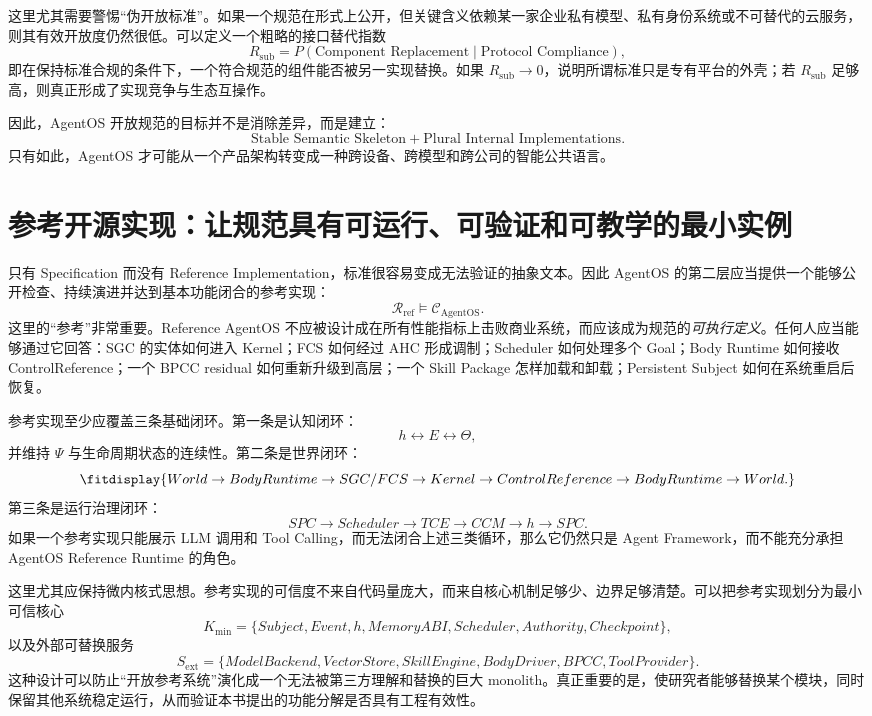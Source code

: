 这里尤其需要警惕``伪开放标准''。如果一个规范在形式上公开，但关键含义依赖某一家企业私有模型、私有身份系统或不可替代的云服务，则其有效开放度仍然很低。可以定义一个粗略的接口替代指数
\[
R_{\mathrm{sub}}
=
P(
\text{Component Replacement}
\mid
\text{Protocol Compliance}
),
\]
即在保持标准合规的条件下，一个符合规范的组件能否被另一实现替换。如果 $R_{\mathrm{sub}}\rightarrow 0$，说明所谓标准只是专有平台的外壳；若 $R_{\mathrm{sub}}$ 足够高，则真正形成了实现竞争与生态互操作。

因此，AgentOS 开放规范的目标并不是消除差异，而是建立：
\[
\boxed{
\text{Stable Semantic Skeleton}
+
\text{Plural Internal Implementations}.
}
\]
只有如此，AgentOS 才可能从一个产品架构转变成一种跨设备、跨模型和跨公司的智能公共语言。

\section{参考开源实现：让规范具有可运行、可验证和可教学的最小实例}

只有 Specification 而没有 Reference Implementation，标准很容易变成无法验证的抽象文本。因此 AgentOS 的第二层应当提供一个能够公开检查、持续演进并达到基本功能闭合的参考实现：
\[
\boxed{
\mathcal R_{\mathrm{ref}}
\models
\mathcal C_{\mathrm{AgentOS}}.
}
\]
这里的``参考''非常重要。Reference AgentOS 不应被设计成在所有性能指标上击败商业系统，而应该成为规范的\emph{可执行定义}。任何人应当能够通过它回答：SGC 的实体如何进入 Kernel；FCS 如何经过 AHC 形成调制；Scheduler 如何处理多个 Goal；Body Runtime 如何接收 ControlReference；一个 BPCC residual 如何重新升级到高层；一个 Skill Package 怎样加载和卸载；Persistent Subject 如何在系统重启后恢复。

参考实现至少应覆盖三条基础闭环。第一条是认知闭环：
\[
h
\leftrightarrow
E
\leftrightarrow
\Theta,
\]
并维持 $\Psi$ 与生命周期状态的连续性。第二条是世界闭环：
\[
\fitdisplay{
World
\rightarrow
BodyRuntime
\rightarrow
SGC/FCS
\rightarrow
Kernel
\rightarrow
ControlReference
\rightarrow
BodyRuntime
\rightarrow
World.
}
\]
第三条是运行治理闭环：
\[
SPC
\rightarrow
Scheduler
\rightarrow
TCE
\rightarrow
CCM
\rightarrow
h
\rightarrow
SPC.
\]
如果一个参考实现只能展示 LLM 调用和 Tool Calling，而无法闭合上述三类循环，那么它仍然只是 Agent Framework，而不能充分承担 AgentOS Reference Runtime 的角色。

这里尤其应保持微内核式思想。参考实现的可信度不来自代码量庞大，而来自核心机制足够少、边界足够清楚。可以把参考实现划分为最小可信核心
\[
K_{\min}
=
\{
Subject,
Event,
h,
MemoryABI,
Scheduler,
Authority,
Checkpoint
\},
\]
以及外部可替换服务
\[
S_{\mathrm{ext}}
=
\{
ModelBackend,
VectorStore,
SkillEngine,
BodyDriver,
BPCC,
ToolProvider
\}.
\]
这种设计可以防止``开放参考系统''演化成一个无法被第三方理解和替换的巨大 monolith。真正重要的是，使研究者能够替换某个模块，同时保留其他系统稳定运行，从而验证本书提出的功能分解是否具有工程有效性。

